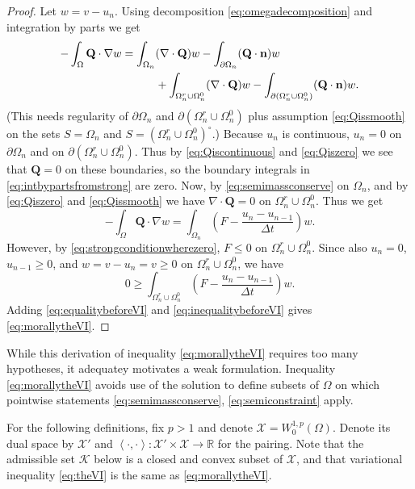 \documentclass[final,leqno,onefignum,onetabnum]{siamltex1213bueler}
\newcommand\bn{\mathbf{n}}
\newcommand\bQ{\mathbf{Q}}
\newcommand{\Div}{\nabla\cdot}
\renewcommand{\grad}{\nabla}
\newcommand{\ip}[2]{\ensuremath{\left<#1,#2\right>}}
\newcommand\RR{\mathbb{R}}
\begin{document}
\begin{proof}  Let $w=v-u_n$.  Using decomposition \eqref{eq:omegadecomposition} and integration by parts we get
\begin{align}
-\int_{\Omega} \bQ \cdot \grad w &= \int_{\Omega_n} (\Div \bQ) w - \int_{\partial \Omega_n} (\bQ \cdot \bn) w \label{eq:intbypartsfromstrong} \\
  &\qquad\quad + \int_{\Omega_n^r \cup \Omega_n^0} (\Div \bQ) w - \int_{\partial(\Omega_n^r \cup \Omega_n^0)} (\bQ \cdot \bn) w. \notag
\end{align}
(This needs regularity of $\partial \Omega_n$ and $\partial(\Omega_n^r \cup \Omega_n^0)$ plus assumption \eqref{eq:Qissmooth} on the sets $S=\Omega_n$ and $S=(\Omega_n^r \cup \Omega_n^0)^\circ$.)  Because $u_n$ is continuous, $u_n=0$ on $\partial \Omega_n$ and on $\partial(\Omega_n^r \cup \Omega_n^0)$.  Thus by \eqref{eq:Qiscontinuous} and \eqref{eq:Qiszero} we see that $\bQ=0$ on these boundaries, so the boundary integrals in \eqref{eq:intbypartsfromstrong} are zero.  Now, by \eqref{eq:semimassconserve} on $\Omega_n$, and by \eqref{eq:Qiszero} and \eqref{eq:Qissmooth} we have $\Div \bQ=0$ on $\Omega_n^r \cup \Omega_n^0$.  Thus we get
\begin{equation}
-\int_{\Omega} \bQ \cdot \grad w = \int_{\Omega_n} \left(F - \frac{u_n - u_{n-1}}{\Delta t}\right) w. \label{eq:equalitybeforeVI}
\end{equation}
However, by \eqref{eq:strongconditionwherezero}, $F \le 0$ on $\Omega_n^r \cup \Omega_n^0$.  Since also $u_n=0$, $u_{n-1}\ge 0$, and $w = v-u_n = v \ge 0$ on $\Omega_n^r \cup \Omega_n^0$, we have
\begin{equation}
    0 \ge \int_{\Omega_n^r \cup \Omega_n^0} \left(F - \frac{u_n - u_{n-1}}{\Delta t}\right) w. \label{eq:inequalitybeforeVI}
\end{equation}
Adding \eqref{eq:equalitybeforeVI} and \eqref{eq:inequalitybeforeVI} gives \eqref{eq:morallytheVI}.
\end{proof}

While this derivation of inequality \eqref{eq:morallytheVI} requires too many hypotheses, it adequatey motivates a weak formulation.  Inequality \eqref{eq:morallytheVI} avoids use of the solution to define subsets of $\Omega$ on which pointwise statements \eqref{eq:semimassconserve}, \eqref{eq:semiconstraint} apply.

For the following definitions, fix $p>1$ and denote $\mathcal{X} = W_0^{1,p}(\Omega)$.  Denote its dual space by $\mathcal{X}'$ and $\ip{\cdot}{\cdot}: \mathcal{X}' \times \mathcal{X} \to \RR$ for the pairing.  Note that the admissible set $\mathcal{K}$ below is a closed and convex subset of $\mathcal{X}$, and that variational inequality \eqref{eq:theVI} is the same as \eqref{eq:morallytheVI}.
\end{document}
